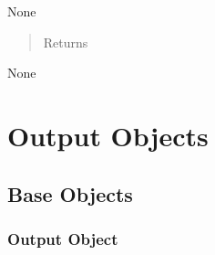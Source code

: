 \documentclass[letterpaper,10pt,english]{sphinxmanual}
\begin{document}
\begin{fulllineitems}
\begin{fulllineitems}
\sphinxAtStartPar
None
\begin{quote}\begin{description}
\item[{Returns}] \leavevmode
\end{description}\end{quote}

\sphinxAtStartPar
None

\end{fulllineitems}


\end{fulllineitems}



\chapter{Output Objects}
\label{\detokenize{output:output-objects}}\label{\detokenize{output::doc}}

\section{Base Objects}
\label{\detokenize{base:base-objects}}\label{\detokenize{base::doc}}

\subsection{Output Object}
\label{\detokenize{base:module-OutputObject}}\label{\detokenize{base:output-object}}
\end{document}
